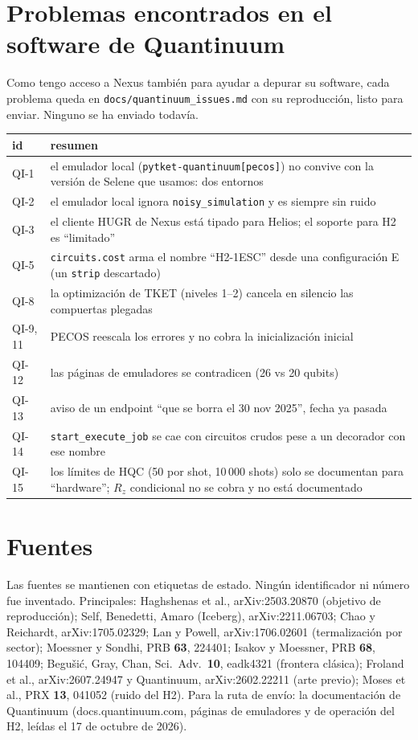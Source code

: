\documentclass[11pt,a4paper]{article}
\newcommand{\code}[1]{\nolinkurl{#1}}
\begin{document}
\section{Problemas encontrados en el software de Quantinuum}
Como tengo acceso a Nexus tambi\'en para ayudar a depurar su software, cada problema queda en
\code{docs/quantinuum\_issues.md} con su reproducci\'on, listo para enviar. Ninguno se ha enviado todav\'ia.
\begin{table}[h]\centering\small
\begin{tabular}{lp{11cm}}
\toprule
id & resumen\\
\midrule
QI-1 & el emulador local (\texttt{pytket-quantinuum[pecos]}) no convive con la versi\'on de Selene que usamos: dos entornos\\
QI-2 & el emulador local ignora \texttt{noisy\_simulation} y es siempre sin ruido\\
QI-3 & el cliente HUGR de Nexus est\'a tipado para Helios; el soporte para H2 es ``limitado''\\
QI-5 & \texttt{circuits.cost} arma el nombre ``H2-1ESC'' desde una configuraci\'on E (un \texttt{strip} descartado)\\
QI-8 & la optimizaci\'on de TKET (niveles 1--2) cancela en silencio las compuertas plegadas\\
QI-9, 11 & PECOS reescala los errores y no cobra la inicializaci\'on inicial\\
QI-12 & las p\'aginas de emuladores se contradicen (26 vs 20 qubits)\\
QI-13 & aviso de un endpoint ``que se borra el 30 nov 2025'', fecha ya pasada\\
QI-14 & \texttt{start\_execute\_job} se cae con circuitos crudos pese a un decorador con ese nombre\\
QI-15 & los l\'imites de HQC (50 por shot, 10\,000 shots) solo se documentan para ``hardware''; $R_z$ condicional no se cobra y no est\'a documentado\\
\bottomrule
\end{tabular}
\end{table}

\section{Fuentes}
Las fuentes se mantienen con etiquetas de estado. Ning\'un identificador ni n\'umero fue inventado. Principales:
Haghshenas et al., arXiv:2503.20870 (objetivo de reproducci\'on); Self, Benedetti, Amaro (Iceberg),
arXiv:2211.06703; Chao y Reichardt, arXiv:1705.02329; Lan y Powell, arXiv:1706.02601 (termalizaci\'on por
sector); Moessner y Sondhi, PRB \textbf{63}, 224401; Isakov y Moessner, PRB \textbf{68}, 104409; Begu\v{s}i\'c,
Gray, Chan, Sci.\ Adv.\ \textbf{10}, eadk4321 (frontera cl\'asica); Froland et al., arXiv:2607.24947 y
Quantinuum, arXiv:2602.22211 (arte previo); Moses et al., PRX \textbf{13}, 041052 (ruido del H2). Para la ruta
de env\'io: la documentaci\'on de Quantinuum (docs.quantinuum.com, p\'aginas de emuladores y de operaci\'on del H2,
le\'idas el 17 de octubre de 2026).
\end{document}
